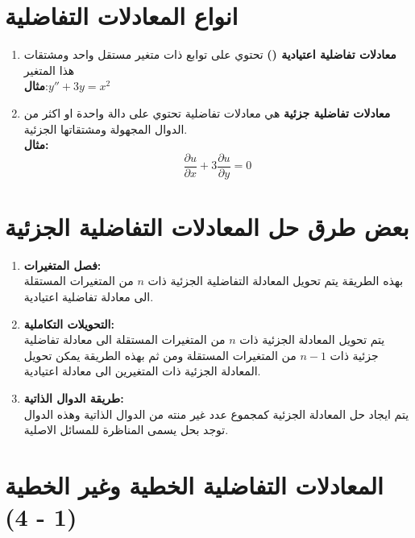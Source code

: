 \section[انواع المعادلات التفاضلية]{انواع المعادلات التفاضلية}

\begin{enumerate}
\item \textbf{معادلات تفاضلية اعتيادية ()} تحتوي على توابع ذات متغير مستقل واحد ومشتقات هذا المتغير \\
\textbf{مثال}:\qquad $y'' + 3y = x^2$
\item \textbf{معادلات تفاضلية جزئية } هي معادلات تفاضلية تحتوي على دالة واحدة او اكثر من الدوال المجهولة ومشتقاتها الجزئية.\\
\textbf{مثال:}\[
\frac{\partial u}{\partial x} + 3 \frac{\partial u}{\partial y} = 0
\]
\end{enumerate}

\section{بعض طرق حل المعادلات التفاضلية الجزئية}
\begin{enumerate}[label=$\bullet$]
	\item \textbf{فصل المتغيرات:}\\ بهذه الطريقة يتم تحويل المعادلة التفاضلية الجزئية ذات $n$ من المتغيرات المستقلة الى معادلة تفاضلية اعتيادية.
	
	\item \textbf{التحويلات التكاملية:}\\ يتم تحويل المعادلة الجزئية ذات $n$ من المتغيرات المستقلة الى معادلة تفاضلية جزئية ذات $n-1$ من المتغيرات المستقلة ومن ثم بهذه الطريقة يمكن تحويل المعادلة الجزئية ذات المتغيرين الى معادلة اعتيادية.
	
	\item \textbf{طريقة الدوال الذاتية: }\\ يتم ايجاد حل المعادلة الجزئية كمجموع عدد غير منته من الدوال الذاتية وهذه الدوال توجد بحل يسمى المناظرة للمسائل الاصلية.
\end{enumerate}

\section*{المعادلات التفاضلية الخطية وغير الخطية (1 - 4)}

